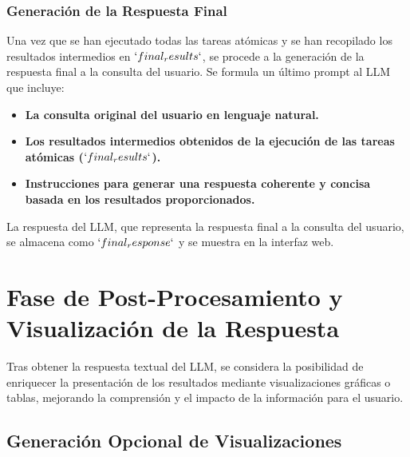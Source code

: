 \subsubsection{Generación de la Respuesta Final}

Una vez que se han ejecutado todas las tareas atómicas y se han recopilado los resultados intermedios en $`final_results`$,  se procede a la generación de la respuesta final a la consulta del usuario.  Se formula un último prompt al LLM que incluye:

\begin{itemize}
	\item \textbf{La consulta original del usuario en lenguaje natural.}
	\item \textbf{Los resultados intermedios obtenidos de la ejecución de las tareas atómicas ($`final_results`$).}
	\item \textbf{Instrucciones para generar una respuesta coherente y concisa basada en los resultados proporcionados.}
\end{itemize}
La respuesta del LLM, que representa la respuesta final a la consulta del usuario,  se almacena como $`final_response`$ y se muestra en la interfaz web.

\section{Fase de Post-Procesamiento y Visualización de la Respuesta}

Tras obtener la respuesta textual del LLM,  se considera la posibilidad de enriquecer la presentación de los resultados mediante visualizaciones gráficas o tablas,  mejorando la comprensión y el impacto de la información para el usuario.

\subsection{Generación Opcional de Visualizaciones}

